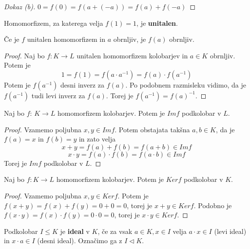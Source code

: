\documentclass[11pt, a4paper]{article}
\begin{document}
    \begin{proof}[Dokaz \emph{(b)}]
        \(0 = f(0) = f(a+(-a)) = f(a) + f(-a)\)
    \end{proof}

    \begin{definition}
        Homomorfizem, za katerega velja \(f(1) = 1\), je \textbf{unitalen}.
    \end{definition}

    \begin{proposition}
        Če je \(f\) unitalen homomorfizem in \(a\) obrnljiv, je \(f(a)\) obrnljiv.
    \end{proposition}

    \begin{proof}
        Naj bo \(f: K \to L\) unitalen homomorfizem kolobarjev in \(a \in K\) obrnljiv. Potem je
        \[1 = f(1) = f(a \cdot a^{-1}) = f(a) \cdot f(a^{-1})\]
        Potem je \(f(a^{-1})\) desni inverz za \(f(a)\). Po podobnem razmisleku vidimo, da je \(f(a^{-1})\) tudi levi inverz za \(f(a)\). Torej je \(f(a^{-1}) = f(a)^{-1}\).
    \end{proof}

    \begin{proposition}
        Naj bo \(f\): \(K \to L\) homomorfizem kolobarjev. Potem je \(Im f\) podkolobar v \(L\).
    \end{proposition}

    \begin{proof}
        Vzamemo poljubna \(x,y \in Im f\). Potem obstajata takšna \(a,b \in K\), da je \(f(a) = x\) in \(f(b) = y\) in zato velja
        \[x + y = f(a) + f(b) = f(a + b) \in Im f\]
        \[x \cdot y = f(a) \cdot f(b) = f(a \cdot b) \in Im f\]
        Torej je \(Im f\) podkolobar v \(L\).
    \end{proof}

    \begin{proposition}
        Naj bo \(f: K \to L\) homomorfizem kolobarjev. Potem je \(Ker f\) podkolobar v \(K\).
    \end{proposition}

    \begin{proof}
        Vzamemo poljubna \(x,y \in Ker f\). Potem je \(f(x + y) = f(x) + f(y) = 0 + 0 = 0\), torej je \(x + y \in Ker f\). Podobno je \(f(x \cdot y) = f(x) \cdot f(y) = 0 \cdot 0 = 0\), torej je \(x \cdot y \in Ker f\). 
    \end{proof}


    \begin{definition}
        Podkolobar \(I \leq K\) je \textbf{ideal} v \(K\), če za vsak \(a \in K, x \in I\) velja \(a \cdot x \in I\) (levi ideal) in \(x \cdot a \in I\) (desni ideal). Označimo ga z \(I \triangleleft K\).
    \end{definition}
\end{document}
